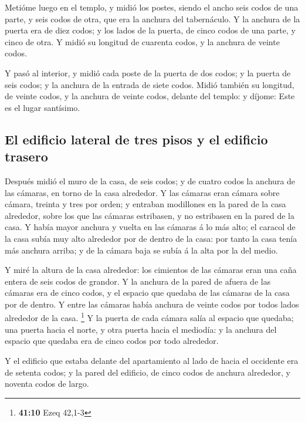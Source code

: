  Metióme luego en el templo, y midió los postes, siendo el
ancho seis codos de una parte, y seis codos de otra, que era la anchura
del tabernáculo.  Y la anchura de la puerta era de diez
codos; y los lados de la puerta, de cinco codos de una parte, y cinco de
otra. Y midió su longitud de cuarenta codos, y la anchura de veinte
codos.

 Y pasó al interior, y midió cada poste de la puerta de dos
codos; y la puerta de seis codos; y la anchura de la entrada de siete
codos.  Midió también su longitud, de veinte codos, y la
anchura de veinte codos, delante del templo: y díjome: Este es el lugar
santísimo.

\hypertarget{el-edificio-lateral-de-tres-pisos-y-el-edificio-trasero}{%
\subsection{El edificio lateral de tres pisos y el edificio
trasero}\label{el-edificio-lateral-de-tres-pisos-y-el-edificio-trasero}}

 Después midió el muro de la casa, de seis codos; y de
cuatro codos la anchura de las cámaras, en torno de la casa alrededor.
 Y las cámaras eran cámara sobre cámara, treinta y tres por
orden; y entraban modillones en la pared de la casa alrededor, sobre los
que las cámaras estribasen, y no estribasen en la pared de la casa.
 Y había mayor anchura y vuelta en las cámaras á lo más
alto; el caracol de la casa subía muy alto alrededor por de dentro de la
casa: por tanto la casa tenía más anchura arriba; y de la cámara baja se
subía á la alta por la del medio.

 Y miré la altura de la casa alrededor: los cimientos de las
cámaras eran una caña entera de seis codos de grandor.  Y la
anchura de la pared de afuera de las cámaras era de cinco codos, y el
espacio que quedaba de las cámaras de la casa por de dentro.
 Y entre las cámaras había anchura de veinte codos por
todos lados alrededor de la casa. \footnote{\textbf{41:10} Ezeq 42,1-3}
 Y la puerta de cada cámara salía al espacio que quedaba;
una puerta hacia el norte, y otra puerta hacia el mediodía: y la anchura
del espacio que quedaba era de cinco codos por todo alrededor.

 Y el edificio que estaba delante del apartamiento al lado
de hacia el occidente era de setenta codos; y la pared del edificio, de
cinco codos de anchura alrededor, y noventa codos de largo.

